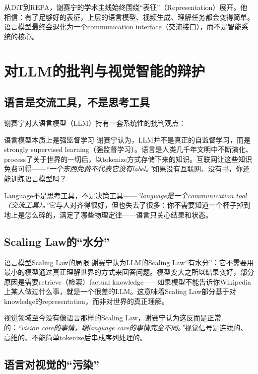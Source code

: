 \documentclass[a4paper]{article}
\begin{document}
从DiT到REPA，谢赛宁的学术主线始终围绕``表征''（Representation）展开。他相信：有了足够好的表征，上层的语言模型、视频生成、理解任务都会变得简单。语言模型最终会退化为一个communication interface（交流接口），而不是智能系统的核心。

\section{对LLM的批判与视觉智能的辩护}

\subsection{语言是交流工具，不是思考工具}

谢赛宁对大语言模型（LLM）持有一套系统性的批判观点：

\begin{importantbox}{语言模型本质上是强监督学习}
谢赛宁认为，LLM并不是真正的自监督学习，而是strongly supervised learning（强监督学习）。语言是人类几千年文明中不断演化、process了关于世界的一切后，以tokenize方式存储下来的知识。互联网让这些知识免费可得——\textit{``一个东西免费不代表它没有label。''}如果没有互联网、没有书，你还能训练语言模型吗？

Language不是思考工具，不是决策工具——\textit{``language是一个communication tool（交流工具）。''}它与人对齐得很好，但也失去了很多：你不需要知道一个杯子掉到地上是怎么碎的，满足了哪些物理定律——语言只关心结果和状态。
\end{importantbox}

\subsection{Scaling Law的``水分''}

\begin{warningbox}{语言模型Scaling Law的局限}
谢赛宁认为LLM的Scaling Law``有水分''：它不需要用最小的模型通过真正理解世界的方式来回答问题。模型变大之所以结果变好，部分原因是需要retrieve（检索）factual knowledge——如果模型不能告诉你Wikipedia上某人做过什么事，就是一个很差的LLM。这意味着Scaling Law部分基于对knowledge的representation，而非对世界的真正理解。

视觉领域至今没有像语言那样的Scaling Law，谢赛宁认为这反而是正常的：\textit{``vision care的事情，跟language care的事情完全不同。''}视觉信号是连续的、高维的、不能简单tokenize后串成序列处理的。
\end{warningbox}

\subsection{语言对视觉的``污染''}
\end{document}
